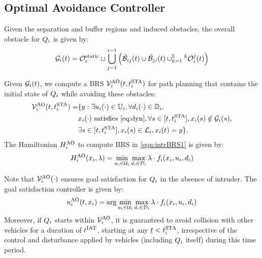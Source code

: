 \subsection{Optimal Avoidance Controller} \label{sec:path_planning}
Given the separation and buffer regions and induced obstacles, the overall obstacle for $Q_i$ is given by:
\begin{equation}
\label{eq:obsseti_intr}
\obsset_i(t)  = \soset_i \cup \bigcup_{j=1}^{i-1} \left( \tilde{\buff}_{ij}(t) \cup \tilde{\buff}_{ji}(t) \cup_{k=1}^{5} {^k\ioset_i^j}(t) \right)
\end{equation}

Given $\mathcal{G}_i(t)$, we compute a BRS $\mathcal{V}^{\text{AO}}_{i}(t, t^\text{STA}_i)$ for path planning that contains the initial state of $Q_i$ while avoiding these obstacles:
\begin{equation} \label{eqn:intrBRS1}
\begin{aligned}
\brs^{\text{AO}}_{i}(t, \sta_i) = & \{y: \exists \ctrl_i(\cdot) \in \cfset_i, \forall \dstb_i(\cdot) \in \dfset_i, \\
& \state_i(\cdot) \text{ satisfies \eqref{eq:dyn}}, \forall s \in [t, \sta_i], \state_i(s) \notin \obsset_i(s), \\
& \exists s \in [t, \sta_i], \state_i(s) \in \targetset_i, \state_i(t) = y \}.
\end{aligned}
\end{equation}
The Hamiltonian $H^{\text{AO}}_{i}$ to compute BRS in \eqref{eqn:intrBRS1} is given by:
\begin{equation} \label{eqn:BRSham}
\ham^{\text{AO}}_{i}(\state_i, \costate) = \min_{\ctrl_i \in \cset_i} \max_{\dstb_i \in \dset_i} \costate \cdot f_i (\state_i, \ctrl_i, \dstb_i)
\end{equation}

Note that $\mathcal{V}^{\text{AO}}_{i}(\cdot)$ ensures goal satisfaction for $Q_i$ in the absence of intruder. The goal satisfaction controller is given by:
\begin{equation}
{u^{\text{AO}}_{i}}(t, x_i) = \arg \min_{u_i \in \mathcal{U}_i} \max_{d_i \in \mathcal{D}_i} \lambda \cdot f_i (x_i, u_i, d_i)
\end{equation}
Moreover, if $Q_i$ starts within $\mathcal{V}^{\text{AO}}_{i}$, it is guaranteed to avoid collision with other vehicles for a duration of $t^\text{IAT}$, starting at any $\underline{t} < t^\text{STA}_i$, irrespective of the control and disturbance applied by vehicles (including $Q_i$ itself) during this time period. 

